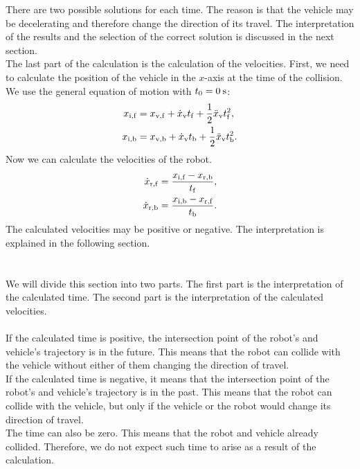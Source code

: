         There are two possible solutions for each time. The reason is that the vehicle may be decelerating and therefore change the direction of its travel. The interpretation of the results and the selection of the correct solution is discussed in the next section.\\
        The last part of the calculation is the calculation of the velocities. First, we need to calculate the position of the vehicle in the $x$-axis at the time of the collision. We use the general equation of motion with $t_{0}=0\:\rm{s}$:
        \begin{align}
            x_{\rm{i,f}} &= x_{\rm{v,f}} + \dot{x}_{\rm{v}}t_{\rm{f}} + \frac{1}{2}\ddot{x}_{\rm{v}}t_{\rm{f}}^2,\\
            x_{\rm{i,b}} &= x_{\rm{v,b}} + \dot{x}_{\rm{v}}t_{\rm{b}} + \frac{1}{2}\ddot{x}_{\rm{v}}t_{\rm{b}}^2.
        \end{align}
        Now we can calculate the velocities of the robot.
        \begin{align}
            \dot{x}_{\rm{r,f}} &= \frac{x_{\rm{i,f}}-x_{\rm{r,b}}}{t_{\rm{f}}},\\
            \dot{x}_{\rm{r,b}} &= \frac{x_{\rm{i,b}}-x_{\rm{r,f}}}{t_{\rm{b}}}.
        \end{align}
        The calculated velocities may be positive or negative. The interpretation is explained in the following section.\\\\
    \\
        We will divide this section into two parts. The first part is the interpretation of the calculated time. The second part is the interpretation of the calculated velocities.\\\\
        If the calculated time is positive, the intersection point of the robot's and vehicle's trajectory is in the future. This means that the robot can collide with the vehicle without either of them changing the direction of travel.\\
        If the calculated time is negative, it means that the intersection point of the robot's and vehicle's trajectory is in the past. This means that the robot can collide with the vehicle, but only if the vehicle or the robot would change its direction of travel.\\
        The time can also be zero. This means that the robot and vehicle already collided. Therefore, we do not expect such time to arise as a result of the calculation.\\
